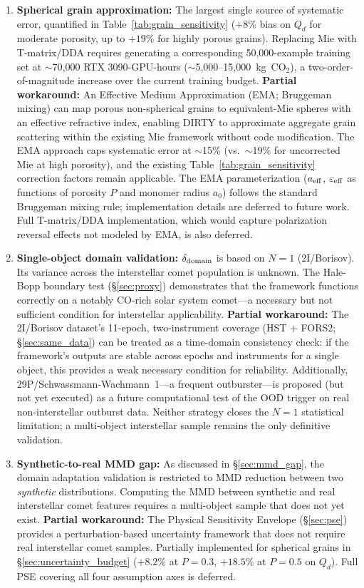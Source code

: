 \documentclass[usenatbib]{mnras}
\begin{document}
\begin{enumerate}
    \item \textbf{Spherical grain approximation:} The largest single source of systematic error, quantified in Table~\ref{tab:grain_sensitivity} ($+8\%$ bias on $Q_d$ for moderate porosity, up to $+19\%$ for highly porous grains). Replacing Mie with T-matrix/DDA requires generating a corresponding 50,000-example training set at $\sim$70,000 RTX 3090-GPU-hours ($\sim$5,000--15,000~kg~CO$_2$), a two-order-of-magnitude increase over the current training budget. \textbf{Partial workaround:} An Effective Medium Approximation (EMA; Bruggeman mixing) can map porous non-spherical grains to equivalent-Mie spheres with an effective refractive index, enabling DIRTY to approximate aggregate grain scattering within the existing Mie framework without code modification. The EMA approach caps systematic error at $\sim$15\% (vs.\ $\sim$19\% for uncorrected Mie at high porosity), and the existing Table~\ref{tab:grain_sensitivity} correction factors remain applicable. The EMA parameterization ($a_{\rm eff}$, $\varepsilon_{\rm eff}$ as functions of porosity $P$ and monomer radius $a_0$) follows the standard Bruggeman mixing rule; implementation details are deferred to future work. Full T-matrix/DDA implementation, which would capture polarization reversal effects not modeled by EMA, is also deferred.
    \item \textbf{Single-object domain validation:} $\delta_{\rm domain}$ is based on $N=1$ (2I/Borisov). Its variance across the interstellar comet population is unknown. The Hale-Bopp boundary test (\S\ref{sec:proxy}) demonstrates that the framework functions correctly on a notably CO-rich solar system comet---a necessary but not sufficient condition for interstellar applicability. \textbf{Partial workaround:} The 2I/Borisov dataset's 11-epoch, two-instrument coverage (HST + FORS2; \S\ref{sec:same_data}) can be treated as a time-domain consistency check: if the framework's outputs are stable across epochs and instruments for a single object, this provides a weak necessary condition for reliability. Additionally, 29P/Schwassmann-Wachmann~1---a frequent outburster---is proposed (but not yet executed) as a future computational test of the OOD trigger on real non-interstellar outburst data. Neither strategy closes the $N=1$ statistical limitation; a multi-object interstellar sample remains the only definitive validation.
    \item \textbf{Synthetic-to-real MMD gap:} As discussed in \S\ref{sec:mmd_gap}, the domain adaptation validation is restricted to MMD reduction between two \textit{synthetic} distributions. Computing the MMD between synthetic and real interstellar comet features requires a multi-object sample that does not yet exist. \textbf{Partial workaround:} The Physical Sensitivity Envelope (\S\ref{sec:pse}) provides a perturbation-based uncertainty framework that does not require real interstellar comet samples. Partially implemented for spherical grains in \S\ref{sec:uncertainty_budget} ($+8.2\%$ at $P{=}0.3$, $+18.5\%$ at $P{=}0.5$ on $Q_d$). Full PSE covering all four assumption axes is deferred.

\end{enumerate}
\end{document}
